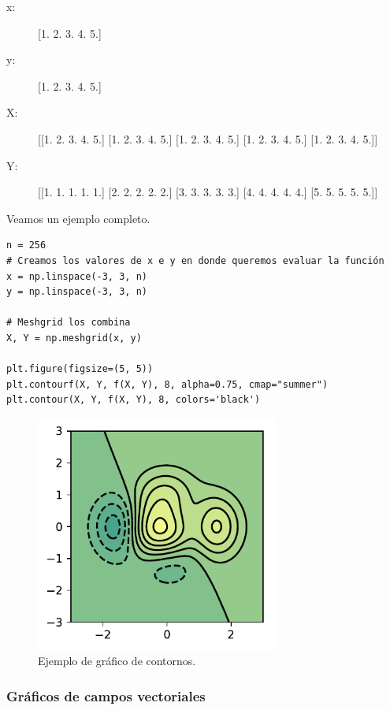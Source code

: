 \begin{description}
\item[x:]
{[}1. 2. 3. 4. 5.{]}
\item[y:]
{[}1. 2. 3. 4. 5.{]}
\item[X:]
{[}{[}1. 2. 3. 4. 5.{]} {[}1. 2. 3. 4. 5.{]} {[}1. 2. 3. 4. 5.{]} {[}1.
2. 3. 4. 5.{]} {[}1. 2. 3. 4. 5.{]}{]}
\item[Y:]
{[}{[}1. 1. 1. 1. 1.{]} {[}2. 2. 2. 2. 2.{]} {[}3. 3. 3. 3. 3.{]} {[}4.
4. 4. 4. 4.{]} {[}5. 5. 5. 5. 5.{]}{]}
\end{description}

Veamos un ejemplo completo.

\begin{listing}[H]
\begin{verbatim}
n = 256
# Creamos los valores de x e y en donde queremos evaluar la función
x = np.linspace(-3, 3, n)
y = np.linspace(-3, 3, n)

# Meshgrid los combina
X, Y = np.meshgrid(x, y)

plt.figure(figsize=(5, 5))
plt.contourf(X, Y, f(X, Y), 8, alpha=0.75, cmap="summer")
plt.contour(X, Y, f(X, Y), 8, colors='black')
\end{verbatim}
\end{listing}

\begin{figure}[H]
	\centering
	\includegraphics[width=8cm]{img/herramientas/grafico_contornos}
	\caption{Ejemplo de gráfico de contornos.}
	\label{fig:grafico_contornos}
\end{figure}

\subsubsection{Gráficos de campos vectoriales}

